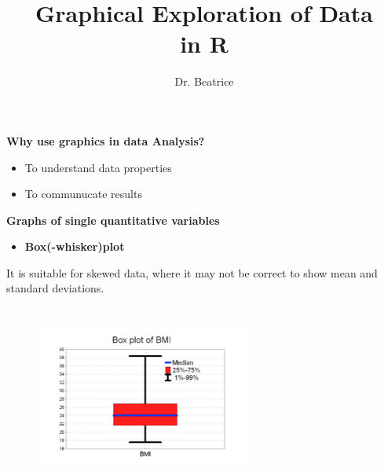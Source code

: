 \documentclass[xcolor=dvipsnames]{beamer}
\begin{document}



\title{\textbf{Graphical Exploration of Data \\
in R}}
\author{Dr. Beatrice}
\titlepage{}

\begin{frame}{\textbf{Why use graphics in data Analysis?}}

\begin{itemize}
\item{To understand data properties}
\item{To communucate results}
\end{itemize}
\end{frame}



\begin{frame}{\textbf{Graphs of single quantitative variables}}
\begin{itemize}
\item{\textbf{Box(-whisker)plot}}
\end{itemize}
It is suitable for skewed data, where it may not be correct to show mean and standard deviations.
\begin{figure}
\includegraphics[width=7.1cm, height=6cm]{box.png}
\end{figure}

\end{frame}
\end{document}
